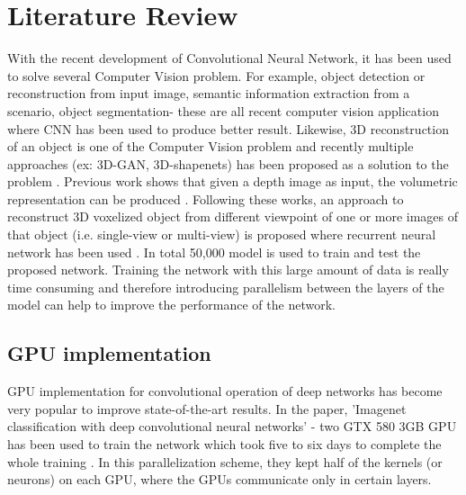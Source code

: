\documentclass[11pt]{article}       %
\begin{document}
\section{Literature Review} \label{litrev}

With the recent development of Convolutional Neural Network, it has been used to solve several Computer Vision problem. For example, object detection or reconstruction from input image, semantic information extraction from a scenario, object segmentation- these are all recent computer vision application where CNN has been used to produce better result. Likewise, 3D reconstruction of an object is one of the Computer Vision problem and recently multiple approaches (ex: 3D-GAN, 3D-shapenets) has been proposed as a solution to the problem \cite{dr1}. Previous work shows that given a depth image as input, the volumetric representation can be produced \cite{dr2}. Following these works, an approach to reconstruct 3D voxelized object from different viewpoint of one or more images of that object (i.e. single-view or multi-view) is proposed where recurrent neural network has been used \cite{dr7}. In total 50,000 model is used to train and test the proposed network. Training the network with this large amount of data is really time consuming and therefore introducing parallelism between the layers of the model can help to improve the performance of the network.

\subsection{GPU implementation} \label{GPUimpl}
GPU implementation for convolutional operation of deep networks has become very popular to improve state-of-the-art results. In the paper, 'Imagenet classification with deep convolutional neural networks' - two GTX 580 3GB GPU has been used to train the network which took five to six days to complete the whole training \cite{dr5}. In this parallelization scheme, they kept half of the kernels (or neurons) on each GPU, where the GPUs communicate only in certain layers.
\end{document}
